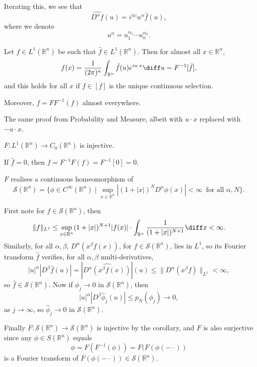 \documentclass[12pt]{article}
\begin{document}
Iterating this, we see that
\[
	\widehat{D^\alpha f}(u) = i^{|a|} u^\alpha \hat f(u),
\]
where we denote
\[
	u^\alpha = u_1^{\alpha_1} \cdots u_n^{\alpha_n}.
\]

\begin{theorem}
	Let $f \in L^1(\mathbb{R}^n)$ be such that $\hat f \in L^1(\mathbb{R}^n)$. Then for almost all $x \in \mathbb{R}^n$,
	\[
		f(x) = \frac{1}{(2 \pi)^n} \int_{\mathbb{R}^n} \hat f(u) e^{i u \cdot x} \diff u = F^{-1}[\hat f],
	\]
	and this holds for all $x$ if $f \in [f]$ is the unique continuous selection.

	Moreover, $f = F F^{-1}(f)$ almost everywhere.
\end{theorem}

\begin{proofbox}
	The same proof from Probability and Measure, albeit with $u \cdot x$ replaced with $-u \cdot x$.
\end{proofbox}

\begin{corollary}
	$F : L^1(\mathbb{R}^n) \to C_0(\mathbb{R}^n)$ is injective.
\end{corollary}

\begin{proofbox}
	If $\hat f = 0$, then $f = F^{-1} F (f) = F^{-1}[0] = 0$.
\end{proofbox}

\begin{theorem}
	$F$ realises a continuous homeomorphism of
	\[
		\mathcal{S}(\mathbb{R}^n) = \{\phi \in C^\infty(\mathbb{R}^n) \mid \sup_{x \in \mathbb{R}^n} |(1 + |x|)^N D^\alpha \phi(x)| < \infty\, \text{ for all } \alpha , N\}.
	\]
\end{theorem}

\begin{proofbox}
	First note for $f \in \mathcal{S}(\mathbb{R}^n)$, then
	\begin{align*}
		\|f\|_{L^1} \leq \sup_{x \in \mathbb{R}^n} (1+|x|)^{N+1} |f(x)| \cdot \int_{\mathbb{R}^n} \frac{1}{(1 + |x|)^{N+1}} \diff x < \infty.
	\end{align*}
	Similarly, for all $\alpha, \beta$, $D^\alpha(x^\beta f(x))$, for $f \in \mathcal{S}(\mathbb{R}^n)$, lies in $L^1$, so its Fourier transform $\hat f$ verifies, for all $\alpha, \beta$ multi-derivatives,
	\[
		|u|^\alpha |D^\beta \hat f(u)| = |\widehat{D^\alpha(x^\beta f(x))}|(u) \leq \|D^\alpha (x^\beta f)\|_{L^1} < \infty,
	\]
	so $\hat f \in \mathcal{S}(\mathbb{R}^n)$. Now if $\phi_j \to 0$ in $\mathcal{S}(\mathbb{R}^n)$, then 
	\[
	|u|^\alpha |D^\beta \hat \phi_j(u)| \leq p_N(\phi_j) \to 0,
	\]
	as $j \to \infty$, so $\hat \phi_j \to 0$ in $\mathcal{S}(\mathbb{R}^n)$.

	Finally $F : \mathcal{S}(\mathbb{R}^n) \to \mathcal{S}(\mathbb{R}^n)$ is injective by the corollary, and $F$ is also surjective since any $\phi \in S(\mathbb{R}^n)$ equals
	\[
	\phi = F (F^{-1}(\phi)) = F(F(\phi(-\cdot))
	\]
	is a Fourier transform of $F(\phi(-\cdot)) \in \mathcal{S}(\mathbb{R}^n)$.
\end{proofbox}
\end{document}
